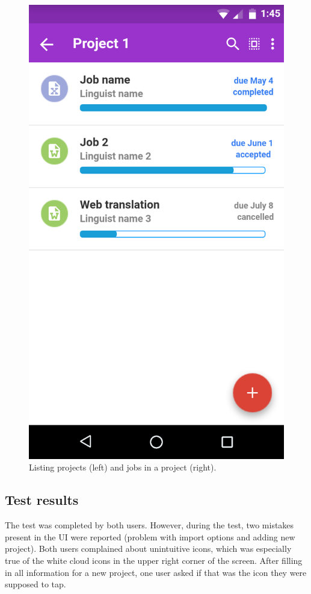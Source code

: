 \begin{figure}
\begin{minipage}{.5\textwidth}
	\end{minipage}%
	\begin{minipage}{.5\textwidth}
		\centering
		\includegraphics[width=.74\linewidth]{pics/protoProject1}
		
	\end{minipage}
	\caption{Listing projects (left) and jobs in a project (right).}
		\label{fig:proto}
\end{figure}


\subsection{Test results}

The test was completed by both users. However, during the test, two mistakes present in the UI were reported (problem with import options and adding new project). Both users complained about unintuitive icons, which was especially true of the white cloud icons in the upper right corner of the screen. After filling in all information for a new project, one user asked if that was the icon they were supposed to tap.

